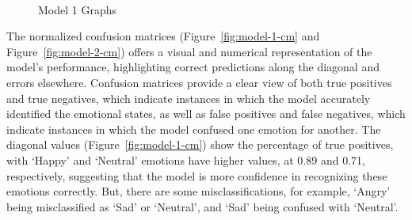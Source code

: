 \begin{figure}[H]
    \centering
    \qquad
    \vspace{0.5cm}
    \\
    \scriptsize{Model 1 Graphs}
\end{figure}
\indent The normalized confusion matrices (Figure~\ref{fig:model-1-cm} and Figure~\ref{fig:model-2-cm}) offers a visual and numerical representation of the model's performance, highlighting correct predictions along the diagonal and errors elsewhere.
Confusion matrices provide a clear view of both true positives and true negatives, which indicate instances in which the model accurately identified the emotional states, as well as false positives and false negatives, which indicate instances in which the model confused one emotion for another.
The diagonal values (Figure~\ref{fig:model-1-cm}) show the percentage of true positives, with `Happy' and `Neutral' emotions have higher values, at 0.89 and 0.71, respectively, suggesting that the model is more confidence in recognizing these emotions correctly.
But, there are some misclassifications, for example, `Angry' being misclassified as `Sad' or `Neutral', and `Sad' being confused with `Neutral'. 
